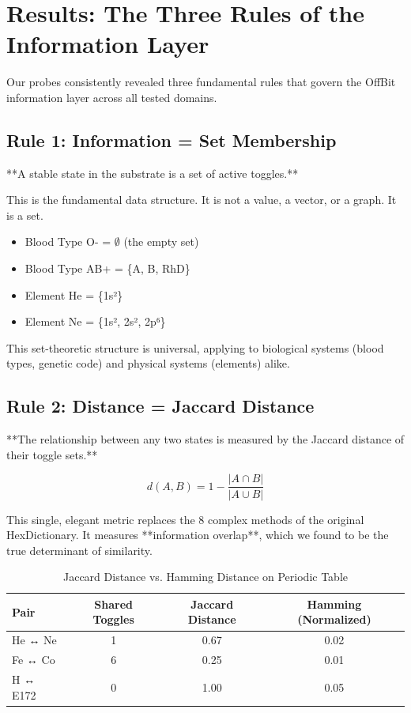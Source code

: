 \documentclass[12pt, a4paper]{article}
\begin{document}
\section{Results: The Three Rules of the Information Layer}

Our probes consistently revealed three fundamental rules that govern the OffBit information layer across all tested domains.

\subsection{Rule 1: Information = Set Membership}

**A stable state in the substrate is a set of active toggles.**

This is the fundamental data structure. It is not a value, a vector, or a graph. It is a set.

\begin{itemize}
    \item Blood Type O- = $\emptyset$ (the empty set)
    \item Blood Type AB+ = \{A, B, RhD\}
    \item Element He = \{1s²\}
    \item Element Ne = \{1s², 2s², 2p⁶\}
\end{itemize}

This set-theoretic structure is universal, applying to biological systems (blood types, genetic code) and physical systems (elements) alike.

\subsection{Rule 2: Distance = Jaccard Distance}

**The relationship between any two states is measured by the Jaccard distance of their toggle sets.**

\begin{equation}
    d(A,B) = 1 - \frac{|A \cap B|}{|A \cup B|}
\end{equation}

This single, elegant metric replaces the 8 complex methods of the original HexDictionary. It measures **information overlap**, which we found to be the true determinant of similarity.

\begin{table}[h!]
\centering
\caption{Jaccard Distance vs. Hamming Distance on Periodic Table}
\begin{tabular}{|l|c|c|c|}
\hline
\textbf{Pair} & \textbf{Shared Toggles} & \textbf{Jaccard Distance} & \textbf{Hamming (Normalized)} \\
\hline
He ↔ Ne & 1 & 0.67 & 0.02 \\
Fe ↔ Co & 6 & 0.25 & 0.01 \\
H ↔ E172 & 0 & 1.00 & 0.05 \\
\hline
\end{tabular}
\label{tab:jaccard_vs_hamming}
\end{table}
\end{document}
